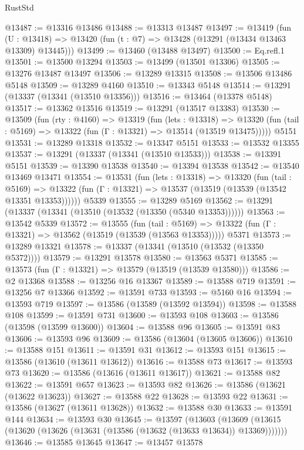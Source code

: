 \begin{lexlean}{RustStd}
\begin{coremodule}
@13487 := @13316 @13486
@13488 := @13313 @13487
@13497 := @13419
    (fun (U : @13418) => @13420 (fun (t : @7) => @13428 (@13291 (@13434 @13463 @13309) @13445)))
@13499 := @13460 (@13488 @13497)
@13500 := Eq.refl.{1}
@13501 := @13500 @13294
@13503 := @13499 (@13501 @13306)
@13505 := @13276 @13487 @13497
@13506 := @13289 @13315
@13508 := @13506 @13486 @5148
@13509 := @13289 @4160
@13510 := @13343 @5148
@13514 := @13291 (@13337 (@13341 (@13510 @13356)))
@13516 := @13464 (@13378 @5148)
@13517 := @13362 @13516
@13519 := @13291 (@13517 @13383)
@13530 := @13509
    (fun (rty : @4160) =>
    @13319
      (fun (lets : @13318) =>
      @13320 (fun (tail : @5169) => @13322 (fun (Γ : @13321) => @13514 (@13519 @13475)))))
    @5151
@13531 := @13289 @13318
@13532 := @13347 @5151
@13533 := @13532 @13355
@13537 := @13291 (@13337 (@13341 (@13510 @13533)))
@13538 := @13391 @5151
@13539 := @13390 @13538
@13540 := @13394 @13538
@13542 := @13540 @13469 @13471
@13554 := @13531
    (fun (lets : @13318) =>
    @13320
      (fun (tail : @5169) =>
      @13322 (fun (Γ : @13321) => @13537 (@13519 (@13539 (@13542 @13351 @13353))))))
    @5339
@13555 := @13289 @5169
@13562 := @13291 (@13337 (@13341 (@13510 (@13532 (@13350 (@5340 @13353))))))
@13563 := @13542 @5339
@13572 := @13555
    (fun (tail : @5169) => @13322 (fun (Γ : @13321) => @13562 (@13519 (@13539 (@13563 @13353)))))
    @5371
@13573 := @13289 @13321
@13578 := @13337 (@13341 (@13510 (@13532 (@13350 @5372))))
@13579 := @13291 @13578
@13580 := @13563 @5371
@13585 := @13573 (fun (Γ : @13321) => @13579 (@13519 (@13539 @13580)))
@13586 := @2 @13368
@13588 := @13256 @16 @13367
@13589 := @13588 @719
@13591 := @13256 @7 @13366
@13592 := @13591 @733
@13593 := @5160 @16
@13594 := @13593 @719
@13597 := @13586 (@13589 (@13592 @13594))
@13598 := @13588 @108
@13599 := @13591 @731
@13600 := @13593 @108
@13603 := @13586 (@13598 (@13599 @13600))
@13604 := @13588 @96
@13605 := @13591 @83
@13606 := @13593 @96
@13609 := @13586 (@13604 (@13605 @13606))
@13610 := @13588 @151
@13611 := @13591 @31
@13612 := @13593 @151
@13615 := @13586 (@13610 (@13611 @13612))
@13616 := @13588 @73
@13617 := @13593 @73
@13620 := @13586 (@13616 (@13611 @13617))
@13621 := @13588 @82
@13622 := @13591 @657
@13623 := @13593 @82
@13626 := @13586 (@13621 (@13622 @13623))
@13627 := @13588 @22
@13628 := @13593 @22
@13631 := @13586 (@13627 (@13611 @13628))
@13632 := @13588 @30
@13633 := @13591 @144
@13634 := @13593 @30
@13645 := @13597
    (@13603 (@13609 (@13615 (@13620 (@13626 (@13631 (@13586 (@13632 (@13633 @13634)) @13369)))))))
@13646 := @13585 @13645
@13647 := @13457 @13578

\end{coremodule}
\end{lexlean}
